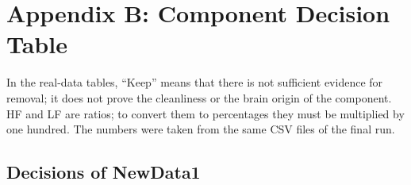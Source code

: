 \clearpage
\section*{Appendix B: Component Decision Table}

In the real-data tables, ``Keep'' means that there is not sufficient evidence for removal; it does not prove the cleanliness or the brain origin of the component. HF and LF are ratios; to convert them to percentages they must be multiplied by one hundred. The numbers were taken from the same CSV files of the final run.

\subsection*{Decisions of NewData1}
